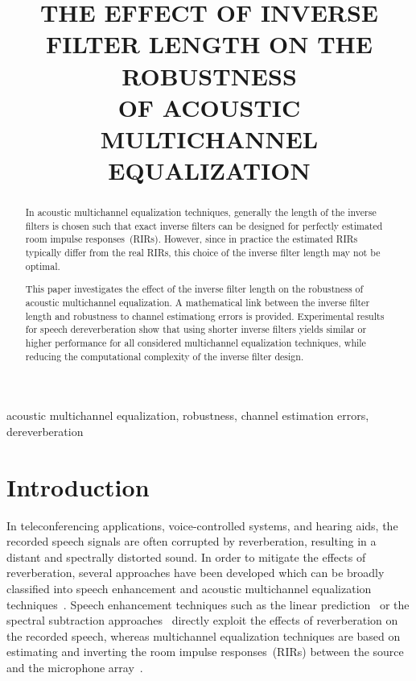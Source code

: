 \documentclass{article}
\title{THE EFFECT OF INVERSE FILTER LENGTH ON THE ROBUSTNESS \\ OF ACOUSTIC MULTICHANNEL EQUALIZATION}
\begin{document}
\maketitle
%
\begin{abstract}
\vspace{-0.1cm}
In acoustic multichannel equalization techniques, generally the length of the inverse filters is chosen such that exact inverse filters can be designed for perfectly estimated room impulse responses~(RIRs).
However, since in practice the estimated RIRs typically differ from the real RIRs, this choice of the inverse filter length may not be optimal.

This paper investigates the effect of the inverse filter length on the robustness of acoustic multichannel equalization.
A mathematical link between the inverse filter length and robustness to channel estimationg errors is provided.
Experimental results for speech dereverberation show that using shorter inverse filters yields similar or higher performance for all considered multichannel equalization techniques, while reducing the computational complexity of the inverse filter design.
\end{abstract}
%
\begin{keywords}
acoustic multichannel equalization, robustness, channel estimation errors, dereverberation
\end{keywords}
%

\vspace{-0.1cm}
\section{Introduction}
\label{sec:intro}
\vspace{-0.2cm}

In teleconferencing applications, voice-controlled systems, and hearing aids, the recorded speech signals are often corrupted by reverberation, resulting in a distant and spectrally distorted sound. 
In order to mitigate the effects of reverberation, several approaches have been developed which can be broadly classified into speech enhancement and acoustic multichannel equalization techniques~\cite{Naylor_Derev_book}.
Speech enhancement techniques such as the linear prediction~\cite{Gaubitch_EUSIPCO_2004} or the spectral subtraction approaches~\cite{Habets2009a} directly exploit the effects of reverberation on the recorded speech, whereas multichannel equalization techniques are based on estimating and inverting the room impulse responses~(RIRs) between the source and the microphone array~\cite{Miyoshi_ITASS_1988, Kodrasi_ICASSP_2012}. 
\end{document}

